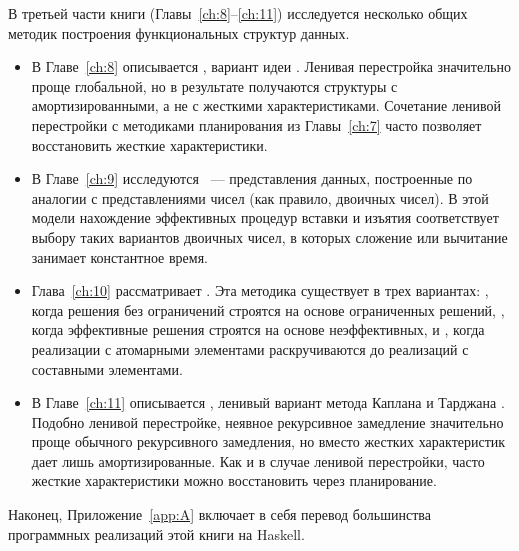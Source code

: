В третьей части книги (Главы~\ref{ch:8}--\ref{ch:11}) исследуется
несколько общих методик построения функциональных структур данных.
\begin{itemize}
\item В Главе~\ref{ch:8} описывается , вариант идеи  \cite{Overmars1983}.  Ленивая перестройка значительно
  проще глобальной, но в результате получаются структуры с
  амортизированными, а не с жесткими характеристиками.  Сочетание
  ленивой перестройки с методиками планирования из Главы~\ref{ch:7}
  часто позволяет восстановить жесткие характеристики.
\item В Главе~\ref{ch:9} исследуются ~--- представления
  данных, построенные по аналогии с представлениями чисел (как
  правило, двоичных чисел). В этой модели нахождение эффективных
  процедур вставки и изъятия соответствует выбору таких вариантов
  двоичных чисел, в которых сложение или вычитание занимает
  константное время.
\item Глава~\ref{ch:10} рассматривает  \cite{Buchsbaum1993}. Эта
  методика существует в трех вариантах: , когда решения без
  ограничений строятся на основе ограниченных решений,
  , когда
  эффективные решения строятся на основе неэффективных, и
  , когда реализации с атомарными элементами раскручиваются до
  реализаций с составными элементами.
\item В Главе~\ref{ch:11} описывается , ленивый вариант метода
   Каплана и
  Тарджана \cite{KaplanTarjan1995}.  Подобно ленивой перестройке,
  неявное рекурсивное замедление значительно проще обычного
  рекурсивного замедления, но вместо жестких характеристик дает лишь
  амортизированные. Как и в случае ленивой перестройки, часто жесткие
  характеристики можно восстановить через планирование.
\end{itemize}

Наконец, Приложение~\ref{app:A} включает в себя перевод большинства
программных реализаций этой книги на Haskell.

